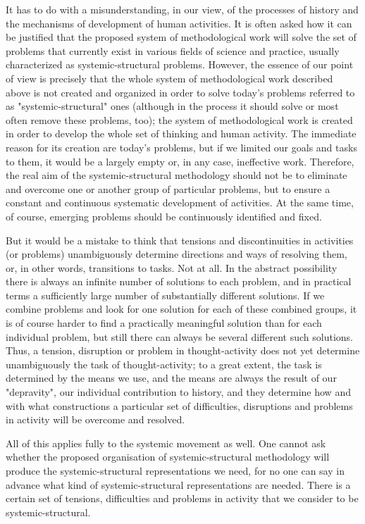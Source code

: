 \documentclass[11pt,a4paper]{article}
\begin{document}
It has to do with a misunderstanding, in our view, of the processes of history
and the mechanisms of development of human activities. It is often asked how
it can be justified that the proposed system of methodological work will solve
the set of problems that currently exist in various fields of science and
practice, usually characterized as systemic-structural problems. However, the
essence of our point of view is precisely that the whole system of
methodological work described above is not created and organized in order to
solve today's problems referred to as "systemic-structural" ones (although in
the process it should solve or most often remove these problems, too); the
system of methodological work is created in order to develop the whole set of
thinking and human activity. The immediate reason for its creation are today's
problems, but if we limited our goals and tasks to them, it would be a largely
empty or, in any case, ineffective work. Therefore, the real aim of the
systemic-structural methodology should not be to eliminate and overcome one or
another group of particular problems, but to ensure a constant and continuous
systematic development of activities. At the same time, of course, emerging
problems should be continuously identified and fixed.

But it would be a mistake to think that tensions and discontinuities in
activities (or problems) unambiguously determine directions and ways of
resolving them, or, in other words, transitions to tasks. Not at all. In the
abstract possibility there is always an infinite number of solutions to each
problem, and in practical terms a sufficiently large number of substantially
different solutions. If we combine problems and look for one solution for each
of these combined groups, it is of course harder to find a practically
meaningful solution than for each individual problem, but still there can
always be several different such solutions. Thus, a tension, disruption or
problem in thought-activity does not yet determine unambiguously the task of
thought-activity; to a great extent, the task is determined by the means we
use, and the means are always the result of our "depravity", our individual
contribution to history, and they determine how and with what constructions a
particular set of difficulties, disruptions and problems in activity will be
overcome and resolved.

All of this applies fully to the systemic movement as well. One cannot ask
whether the proposed organisation of systemic-structural methodology will
produce the systemic-structural representations we need, for no one can say in
advance what kind of systemic-structural representations are needed. There is
a certain set of tensions, difficulties and problems in activity that we
consider to be systemic-structural.
\end{document}
